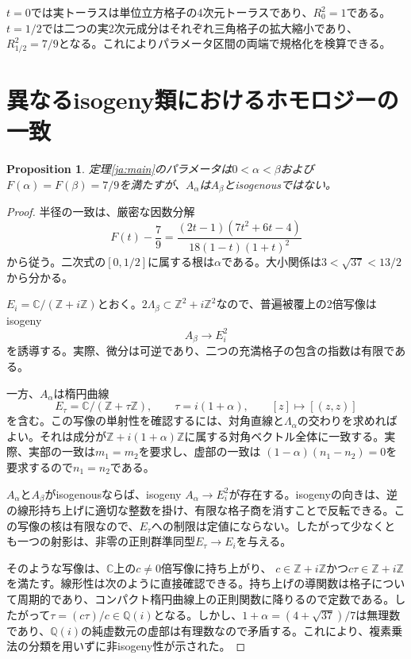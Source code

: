 \documentclass[12pt]{amsart}
\newcommand{\PropositionName}{Proposition}
\newtheorem{prop}[thm]{\PropositionName}
\theoremstyle{definition}
\theoremstyle{remark}
\numberwithin{equation}{section}
\newcommand{\Z}{\mathbb{Z}}
\newcommand{\C}{\mathbb{C}}
\newcommand{\Q}{\mathbb{Q}}
\begin{document}
$t=0$では実トーラスは単位立方格子の4次元トーラスであり、$R_0^2=1$である。$t=1/2$では二つの実2次元成分はそれぞれ三角格子の拡大縮小であり、$R_{1/2}^2=7/9$となる。これによりパラメータ区間の両端で規格化を検算できる。

\section{異なるisogeny類におけるホモロジーの一致}
\begin{prop}\label{ja:collision}
定理\ref{ja:main}のパラメータは$0<\alpha<\beta$および$F(\alpha)=F(\beta)=7/9$を満たすが、$A_\alpha$は$A_\beta$とisogenousではない。
\end{prop}
\begin{proof}
半径の一致は、厳密な因数分解
\begin{equation}\label{ja:factor}
F(t)-\frac79
=\frac{(2t-1)(7t^2+6t-4)}{18(1-t)(1+t)^2}
\end{equation}
から従う。二次式の$[0,1/2]$に属する根は$\alpha$である。大小関係は$3<\sqrt{37}<13/2$から分かる。

$E_i=\C/(\Z+i\Z)$とおく。$2\Lambda_\beta\subset\Z^2+i\Z^2$なので、普遍被覆上の2倍写像はisogeny
\[
A_\beta\longrightarrow E_i^2
\]
を誘導する。実際、微分は可逆であり、二つの充満格子の包含の指数は有限である。

一方、$A_\alpha$は楕円曲線
\[
E_\tau=\C/(\Z+\tau\Z),\qquad \tau=i(1+\alpha),
\qquad [z]\longmapsto[(z,z)]
\]
を含む。この写像の単射性を確認するには、対角直線と$\Lambda_\alpha$の交わりを求めればよい。それは成分が$\Z+i(1+\alpha)\Z$に属する対角ベクトル全体に一致する。実際、実部の一致は$m_1=m_2$を要求し、虚部の一致は
$(1-\alpha)(n_1-n_2)=0$を要求するので$n_1=n_2$である。

$A_\alpha$と$A_\beta$がisogenousならば、isogeny $A_\alpha\to E_i^2$が存在する。isogenyの向きは、逆の線形持ち上げに適切な整数を掛け、有限な格子商を消すことで反転できる。この写像の核は有限なので、$E_\tau$への制限は定値にならない。したがって少なくとも一つの射影は、非零の正則群準同型$E_\tau\to E_i$を与える。

そのような写像は、$\C$上の$c\ne0$倍写像に持ち上がり、
$c\in\Z+i\Z$かつ$c\tau\in\Z+i\Z$を満たす。線形性は次のように直接確認できる。持ち上げの導関数は格子について周期的であり、コンパクト楕円曲線上の正則関数に降りるので定数である。したがって$\tau=(c\tau)/c\in\Q(i)$となる。しかし、$1+\alpha=(4+\sqrt{37})/7$は無理数であり、$\Q(i)$の純虚数元の虚部は有理数なので矛盾する。これにより、複素乗法の分類を用いずに非isogeny性が示された。
\end{proof}
\end{document}
